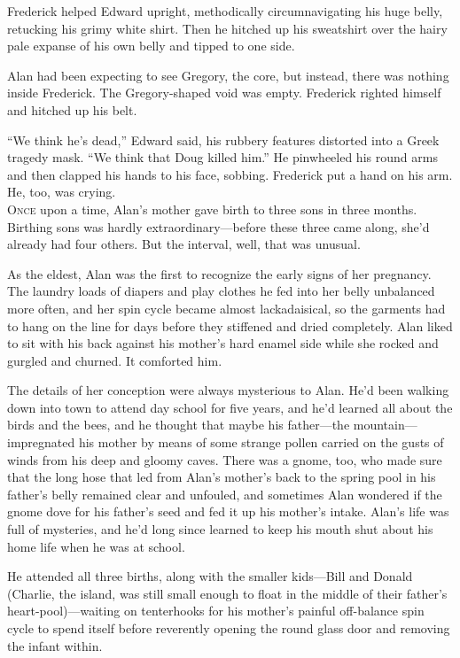 Frederick helped Edward upright, methodically circumnavigating his
huge belly, retucking his grimy white shirt.  Then he hitched up his
sweatshirt over the hairy pale expanse of his own belly and tipped to
one side.

Alan had been expecting to see Gregory, the core, but instead, there
was nothing inside Frederick.  The Gregory-shaped void was empty. 
Frederick righted himself and hitched up his belt.

``We think he's dead,'' Edward said, his rubbery features distorted
into a Greek tragedy mask.  ``We think that Doug killed him.'' He
pinwheeled his round arms and then clapped his hands to his face,
sobbing.  Frederick put a hand on his arm.  He, too, was crying.
\\
\lettrine[lines=3, lhang=.5, nindent=0pt, findent=2pt]{O}{nce} upon a time, Alan's mother gave birth to three sons in three
months.  Birthing sons was hardly extraordinary---before these three
came along, she'd already had four others.  But the interval, well,
that was unusual.

As the eldest, Alan was the first to recognize the early signs of her
pregnancy.  The laundry loads of diapers and play clothes he fed into
her belly unbalanced more often, and her spin cycle became almost
lackadaisical, so the garments had to hang on the line for days before
they stiffened and dried completely.  Alan liked to sit with his back
against his mother's hard enamel side while she rocked and gurgled and
churned.  It comforted him.

The details of her conception were always mysterious to Alan.  He'd
been walking down into town to attend day school for five years, and
he'd learned all about the birds and the bees, and he thought that
maybe his father---the mountain---impregnated his mother by means of
some strange pollen carried on the gusts of winds from his deep and
gloomy caves.  There was a gnome, too, who made sure that the long
hose that led from Alan's mother's back to the spring pool in his
father's belly remained clear and unfouled, and sometimes Alan
wondered if the gnome dove for his father's seed and fed it up his
mother's intake.  Alan's life was full of mysteries, and he'd long
since learned to keep his mouth shut about his home life when he was
at school.

He attended all three births, along with the smaller kids---Bill and
Donald (Charlie, the island, was still small enough to float in the
middle of their father's heart-pool)---waiting on tenterhooks for his
mother's painful off-balance spin cycle to spend itself before
reverently opening the round glass door and removing the infant
within.

